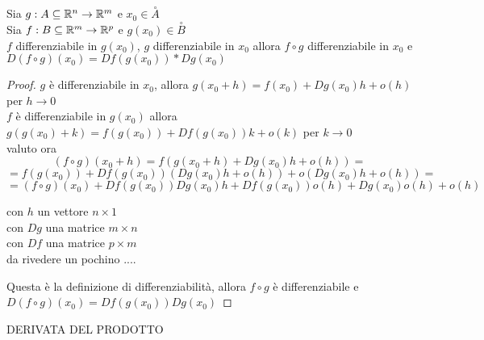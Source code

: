 \proposition
Sia $g: A\subseteq \mathbb{R}^n \rightarrow \mathbb{R}^m$ e $x_0\in\overset{\circ}{A}$\\
Sia $f: B\subseteq \mathbb{R}^m \rightarrow \mathbb{R}^p$ e $g(x_0)\in\overset{\circ}{B}$\\
$f$ differenziabile in $g(x_0)$, $g$ differenziabile in $x_0$ allora $f\circ g$ differenziabile in $x_0$ e $D(f\circ g)(x_0) = Df(g(x_0))*Dg(x_0)$
\begin{proof}
	$g$ è differenziabile in $x_0$, allora $g(x_0+h)=f(x_0)+Dg(x_0)h+o(h)$ per $h\rightarrow 0$\\
	$f$ è differenziabile in $g(x_0)$ allora $g(g(x_0)+k)=f(g(x_0))+Df(g(x_0))k+o(k)$ per $k\rightarrow 0$\\
	valuto ora 
	$$(f\circ g)(x_0+h) = f(g(x_0+h)+Dg(x_0)h+o(h)) = $$ 
	$$=f(g(x_0))+Df(g(x_0))(Dg(x_0)h+o(h))+o(Dg(x_0)h+o(h)) = $$
	$$=(f\circ g)(x_0) + Df(g(x_0))Dg(x_0)h+Df(g(x_0))o(h)+Dg(x_0)o(h)+o(h)$$
	
	con $h$ un vettore $n\times 1$\\
	con $Dg$ una matrice $m\times n$\\
	con $Df$ una matrice $p\times m$\\
	
	da rivedere un pochino ....
	
	Questa è la definizione di differenziabilità, allora $f\circ g$ è differenziabile e $D(f\circ g)(x_0) = Df(g(x_0))Dg(x_0)$
\end{proof}
\proposition DERIVATA DEL PRODOTTO

